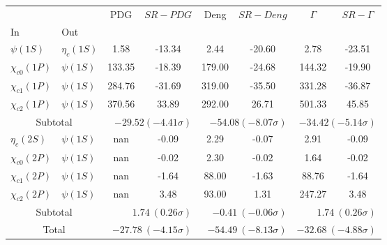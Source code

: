 \begin{tabular}{|l|l|c|c|c|c|c|c|}%
\hline%
&&PDG&$SR-PDG$&Deng&$SR-Deng$&$\Gamma$&$SR-\Gamma$\\%
In&Out&&&&&&\\%
\hline%
$\psi(1S)$&$\eta_{c}(1S)$&1.58&-13.34&2.44&-20.60&2.78&-23.51\\%
$\chi_{c0}(1P)$&$\psi(1S)$&133.35&-18.39&179.00&-24.68&144.32&-19.90\\%
$\chi_{c1}(1P)$&$\psi(1S)$&284.76&-31.69&319.00&-35.50&331.28&-36.87\\%
$\chi_{c2}(1P)$&$\psi(1S)$&370.56&33.89&292.00&26.71&501.33&45.85\\%
\hline%
\hline%
\multicolumn{2}{|c|}{Subtotal}&\multicolumn{2}{|r|}{$-29.52 (-4.41\sigma)$}&\multicolumn{2}{|r|}{$-54.08 (-8.07\sigma)$}&\multicolumn{2}{|r|}{$-34.42 (-5.14\sigma)$}\\%
\hline%
\hline%
$\eta_{c}(2S)$&$\psi(1S)$&nan&-0.09&2.29&-0.07&2.91&-0.09\\%
$\chi_{c0}(2P)$&$\psi(1S)$&nan&-0.02&2.30&-0.02&1.64&-0.02\\%
$\chi_{c1}(2P)$&$\psi(1S)$&nan&-1.64&88.00&-1.63&88.76&-1.64\\%
$\chi_{c2}(2P)$&$\psi(1S)$&nan&3.48&93.00&1.31&247.27&3.48\\%
\hline%
\hline%
\multicolumn{2}{|c|}{Subtotal}&\multicolumn{2}{|r|}{$1.74~(0.26\sigma)$}&\multicolumn{2}{|r|}{$-0.41~(-0.06\sigma)$}&\multicolumn{2}{|r|}{$1.74~(0.26\sigma)$}\\%
\hline%
\hline%
\multicolumn{2}{|c|}{Total}&\multicolumn{2}{|r|}{$-27.78~(-4.15\sigma)$}&\multicolumn{2}{|r|}{$-54.49~(-8.13\sigma)$}&\multicolumn{2}{|r|}{$-32.68~(-4.88\sigma)$}\\%
\hline%
\end{tabular}